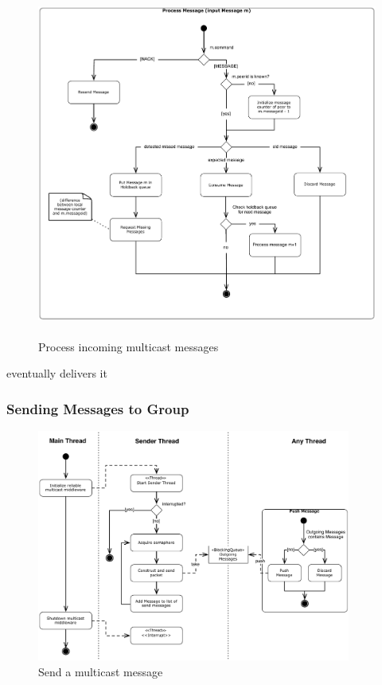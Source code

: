 \begin{figure}[htbp]
    \centering
        \includegraphics[height=4.5in]{figures/processMessages.pdf}
    \caption{Process incoming multicast messages}
    \label{fig:figures_processMessages}
\end{figure}

eventually delivers it


\subsubsection{Sending Messages to Group}

\begin{figure}[htbp]
    \centering
        \includegraphics[height=3in]{figures/sendMessage.pdf}
    \caption{Send a multicast message}
    \label{fig:figures_processMessages}
\end{figure}

